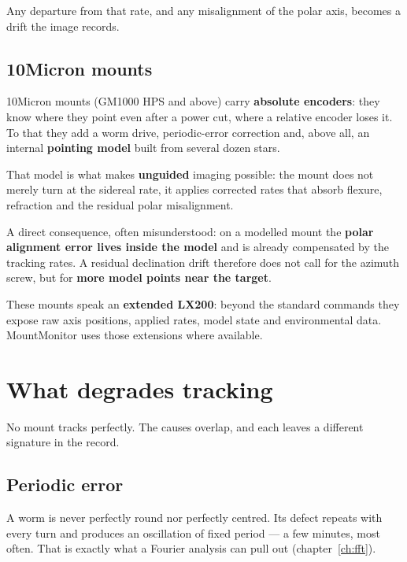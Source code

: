 Any departure from that rate, and any misalignment of the polar axis, becomes a
drift the image records.

\section{10Micron mounts}

10Micron mounts (GM1000 HPS and above) carry \textbf{absolute encoders}: they
know where they point even after a power cut, where a relative encoder loses
it. To that they add a worm drive, periodic-error correction and, above all, an
internal \textbf{pointing model} built from several dozen stars.

That model is what makes \textbf{unguided} imaging possible: the mount does not
merely turn at the sidereal rate, it applies corrected rates that absorb
flexure, refraction and the residual polar misalignment.

\begin{warning}
A direct consequence, often misunderstood: on a modelled mount the
\textbf{polar alignment error lives inside the model} and is already
compensated by the tracking rates. A residual declination drift therefore does
not call for the azimuth screw, but for \textbf{more model points near the
target}.
\end{warning}

These mounts speak an \textbf{extended LX200}: beyond the standard commands
they expose raw axis positions, applied rates, model state and environmental
data. MountMonitor uses those extensions where available.

\chapter{What degrades tracking}
\label{ch:errors}

No mount tracks perfectly. The causes overlap, and each leaves a different
signature in the record.

\section{Periodic error}

A worm is never perfectly round nor perfectly centred. Its defect repeats with
every turn and produces an oscillation of fixed period --- a few minutes, most
often. That is exactly what a Fourier analysis can pull out
(chapter~\ref{ch:fft}).

